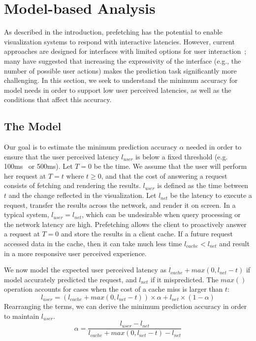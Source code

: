 
\section{Model-based Analysis}

As described in the introduction, prefetching has the potential to enable visualization systems to respond with interactive latencies.  However, current approaches are designed for interfaces with limited options for user interaction~\cite{}; many have suggested that increasing the expressivity of the interface (e.g., the number of possible user actions) makes the prediction task significantly more challenging.  In this section, we seek to understand the minimum accuracy for model needs in order to support low user perceived latencies, as well as the conditions that affect this accuracy.

\subsection{The Model}

Our goal is to estimate the minimum prediction accuracy $\alpha$ needed in order to ensure that the user perceived latency $l_{user}$ is below a fixed threshold (e.g. 100ms~\cite{} or 500ms).
Let $T=0$ be the time.
We assume that the user will perform her request at $T=t$ where $t \ge 0$, and that the cost of answering a request consists of fetching and rendering the results.
$l_{user}$ is defined as the time between $t$ and the change reflected in the visualization. 
Let $l_{net}$ be the latency to execute a request, transfer the results across the network, and render it on screen.   In a typical system, $l_{user} = l_{net}$, which can be undesirable when query processing or the network latency are high.
Prefetching allows the client to proactively answer a request at $T=0$ and store the results in a client cache.
If a future request accessed data in the cache, then it can take much less time $l_{cache} < l_{net}$ and result in a more responsive user perceived experience.

We now model the expected user perceived latency as $l_{cache} + max(0, l_{net} - t)$ if model accurately predicted the request, and $l_{net}$ if it mispredicted.  The $max()$ operation accounts for cases when the cost of a cache miss is larger than $t$:
$$l_{user} = (l_{cache} + max(0, l_{net}-t))\times \alpha + l_{net}\times(1-\alpha) $$
Rearranging the terms, we can derive the minimum prediction accuracy in order to maintain $l_{user}$.
$$\alpha = \frac{l_{user} - l_{net}}{l_{cache} + max(0, l_{net}-t) - l_{net}}$$

